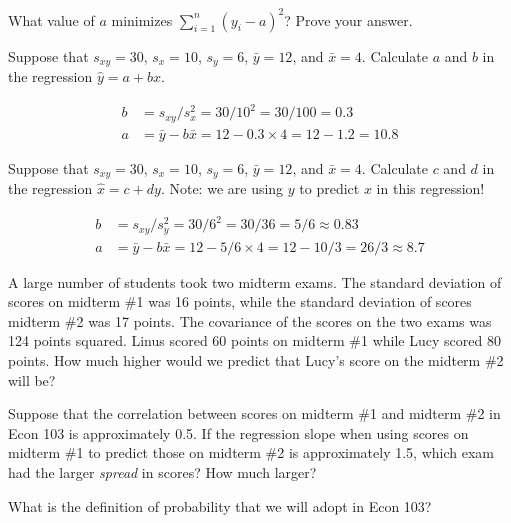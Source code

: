 \documentclass[addpoints,12pt]{exam}
\begin{document}
\begin{questions}
\question What value of $a$ minimizes $\displaystyle\sum_{i=1}^n (y_i - a)^2$? Prove your answer.

\question Suppose that $s_{xy} = 30$, $s_x = 10$, $s_{y} = 6$, $\bar{y} = 12$, and $\bar{x} = 4$. Calculate $a$ and $b$ in the regression $\widehat{y} = a + bx$.
\begin{solution}
  \begin{align*}
  b &= s_{xy}/s_x^2 = 30 / 10^2 = 30/100 = 0.3\\
  a &= \bar{y} - b \bar{x} = 12 - 0.3 \times 4 = 12 - 1.2 = 10.8
  \end{align*}
\end{solution}

\question Suppose that $s_{xy} = 30$, $s_x = 10$, $s_{y} = 6$, $\bar{y} = 12$, and $\bar{x} = 4$. Calculate $c$ and $d$ in the regression $\widehat{x} = c + dy$. Note: we are using $y$ to predict $x$ in this regression!
\begin{solution}
  \begin{align*}
  b &= s_{xy}/s_y^2 = 30 / 6^2 = 30/36 = 5/6 \approx 0.83\\ 
  a &= \bar{y} - b \bar{x} = 12 - 5/6 \times 4 = 12 - 10/3 = 26/3 \approx 8.7
  \end{align*}
\end{solution}

\question A large number of students took two midterm exams. The standard deviation of scores on midterm \#1 was 16 points, while the standard deviation of scores midterm \#2 was 17 points. The covariance of the scores on the two exams was 124 points squared. Linus scored 60 points on midterm \#1 while Lucy scored 80 points. How much higher would we predict that Lucy's score on the midterm \#2 will be?

\question Suppose that the correlation between scores on midterm \#1 and midterm \#2 in Econ 103 is approximately 0.5. If the regression slope when using scores on midterm \#1 to predict those on midterm \#2 is approximately 1.5, which exam had the larger \emph{spread} in scores? How much larger?


\question What is the definition of probability that we will adopt in Econ 103?


\end{questions}
\end{document}

